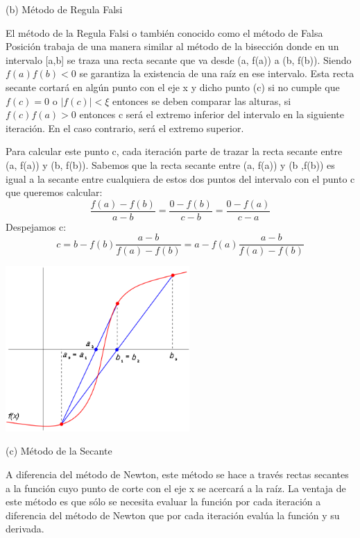 \documentclass[11pt]{article}
\begin{document}
{\large (b) Método de Regula Falsi}

El método de la Regula Falsi o también conocido como el método de Falsa Posición trabaja de una manera similar al método de la bisección donde en un intervalo [a,b] se traza una recta secante que va desde (a, f(a)) a (b, f(b)). Siendo $f(a)f(b)<0$ se garantiza la existencia de una raíz en ese intervalo. Esta recta secante cortará en algún punto con el eje x y dicho punto (c) si no cumple que $f(c) = 0$ o $|f(c)|<\xi$ entonces se deben comparar las alturas, si $f(c)f(a)>0$ entonces c será el extremo inferior del intervalo en la siguiente iteración. En el caso contrario, será el extremo superior.

Para calcular este punto c, cada iteración parte de trazar la recta secante entre (a, f(a)) y (b, f(b)). Sabemos que la recta secante entre (a, f(a)) y (b ,f(b)) es igual a la secante entre  cualquiera de estos dos puntos del intervalo con el punto c que queremos calcular:
    $$\frac{f(a)-f(b)}{a-b} = \frac{0-f(b)}{c-b} = \frac{0-f(a)}{c-a} $$
 Despejamos c:
	$$c = b - f(b) \frac{a-b}{f(a)-f(b)} = a - f(a) \frac{a-b}{f(a)-f(b)}$$
	
\begin{center}
    \includegraphics[keepaspectratio, width=7cm]{RFM.png}
    \caption{\\}
\end{center} 

\vspace{0.5cm}


{\large (c) Método de la Secante}

A diferencia del método de Newton, este método se hace a través rectas secantes a la función cuyo punto de corte con el eje x se acercará a la raíz. La ventaja de este método es que sólo se necesita evaluar la función por cada iteración a diferencia del método de Newton que por cada iteración evalúa la función y su derivada.
\end{document}

